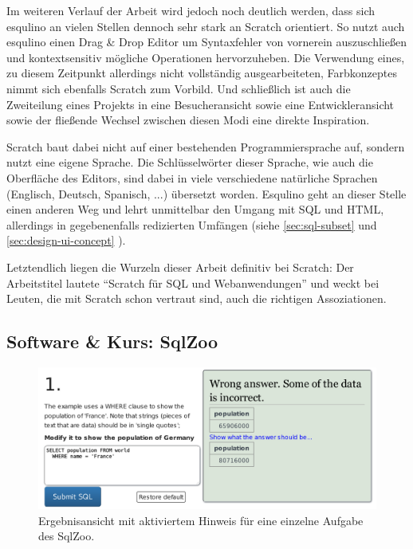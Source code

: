 Im weiteren Verlauf der Arbeit wird jedoch noch deutlich werden, dass sich esqulino an vielen Stellen dennoch sehr stark an Scratch orientiert. So nutzt auch esqulino einen Drag \& Drop Editor um Syntaxfehler von vornerein auszuschließen und kontextsensitiv mögliche Operationen hervorzuheben. Die Verwendung eines, zu diesem Zeitpunkt allerdings nicht vollständig ausgearbeiteten, Farbkonzeptes nimmt sich ebenfalls Scratch zum Vorbild. Und schließlich ist auch die Zweiteilung eines Projekts in eine Besucheransicht sowie eine Entwickleransicht sowie der fließende Wechsel zwischen diesen Modi eine direkte Inspiration.

Scratch baut dabei nicht auf einer bestehenden Programmiersprache auf, sondern nutzt eine eigene Sprache. Die Schlüsselwörter dieser Sprache, wie auch die Oberfläche des Editors, sind dabei in viele verschiedene natürliche Sprachen (Englisch, Deutsch, Spanisch, ...) übersetzt worden. Esqulino geht an dieser Stelle einen anderen Weg und lehrt unmittelbar den Umgang mit SQL und HTML, allerdings in gegebenenfalls redizierten Umfängen (siehe \ref{sec:sql-subset}  und \ref{sec:design-ui-concept} ).

Letztendlich liegen die Wurzeln dieser Arbeit definitiv bei Scratch: Der Arbeitstitel lautete "`Scratch für SQL und Webanwendungen"' und weckt bei Leuten, die mit Scratch schon vertraut sind, auch die richtigen Assoziationen.

\subsection{Software \& Kurs: SqlZoo}

\begin{figure}[p]
  \centering \includegraphics[width=\textwidth]{images/related-work-sql-zoo.png}
  \caption{Ergebnisansicht mit aktiviertem Hinweis für eine einzelne Aufgabe des SqlZoo.}
  \label{fig:sqlzoo-check-result}
\end{figure}

